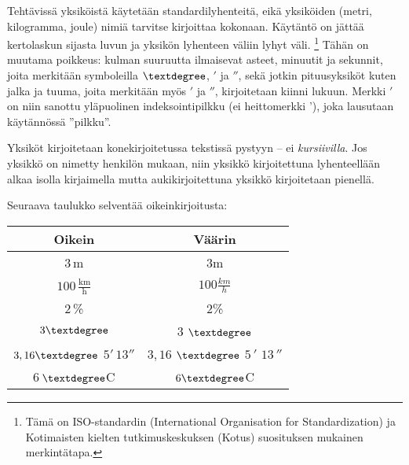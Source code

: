 
Tehtävissä yksiköistä käytetään standardilyhenteitä, eikä yksiköiden (metri, kilogramma, joule) nimiä tarvitse kirjoittaa kokonaan. Käytäntö on jättää kertolaskun sijasta luvun ja yksikön lyhenteen väliin lyhyt väli. \footnote{Tämä on ISO-standardin (International Organisation for Standardization) ja Kotimaisten kielten tutkimuskeskuksen (Kotus) suosituksen mukainen merkintätapa.} Tähän on muutama poikkeus: kulman suuruutta ilmaisevat asteet, minuutit ja sekunnit, joita merkitään symboleilla $\textdegree$, $'$ ja $''$, sekä jotkin pituusyksiköt kuten jalka ja tuuma, joita merkitään myös $'$ ja $''$, kirjoitetaan kiinni lukuun. Merkki $'$ on niin sanottu yläpuolinen indeksointipilkku (ei heittomerkki '), joka lausutaan käytännössä ''pilkku''.

Yksiköt kirjoitetaan konekirjoitetussa tekstissä pystyyn -- ei \textit{kursiivilla}. Jos yksikkö on nimetty henkilön mukaan, niin yksikkö kirjoitettuna lyhenteellään alkaa isolla kirjaimella mutta aukikirjoitettuna yksikkö kirjoitetaan pienellä.

\begin{esimerkki}
\end{esimerkki}

\newpage %
\begin{esimerkki}
Seuraava taulukko selventää oikeinkirjoitusta:
\begin{center}
\begin{tabular}{c|c}
Oikein & Väärin \\
\hline
$3$\,m & $3$m 	\\
$100$\,$\frac{\text{km}}{\text{h}}$ & $100\frac{km}{h}$	\\
$2$\,\% & $2$\% \\
$3\textdegree$ & $3$ $\textdegree$\\
$3,16\textdegree$ $5'$\,$13''$ & $3,16$ $\textdegree$ $5$\,$'$ $13$\,$''$ 	\\
$6$\,$\textdegree$C & $6\textdegree$C 	\\
\end{tabular}
\end{center}
\end{esimerkki}


